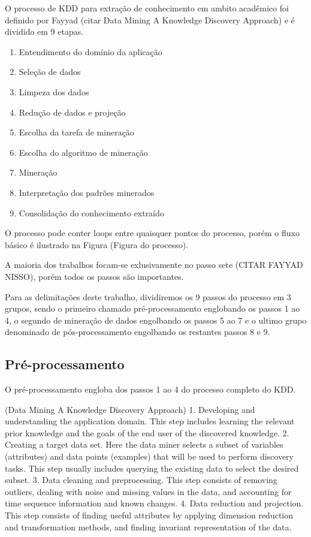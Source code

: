 O processo de KDD para extração de conhecimento em ambito acadêmico foi definido por Fayyad (citar Data Mining A Knowledge Discovery Approach) e é dividido em 9 etapas.

\begin{enumerate}
	\item Entendimento do domínio da aplicação
	\item Seleção de dados
	\item Limpeza dos dados
	\item Redução de dados e projeção
	\item Escolha da tarefa de mineração
	\item Escolha do algoritmo de mineração
	\item Mineração
	\item Interpretação dos padrões minerados
	\item Consolidação do conhecimento extraído
\end{enumerate}

O processo pode conter loops entre quaisquer pontos do processo, porém o fluxo básico é ilustrado na Figura (Figura do processo).

A maioria dos trabalhos focam-se exlusivamente no passo sete (CITAR FAYYAD NISSO), porém todos os passos são importantes.

Para as delimitações deste trabalho, dividiremos os 9 passos do processo em 3 grupos, sendo o primeiro chamado pré-processamento englobando os passos 1 ao 4, o segundo de mineração de dados engolbando os passos 5 ao 7 e o ultimo grupo denominado de pós-processamento engolbando os restantes passos 8 e 9.

\subsection{Pré-processamento}
\label{subsec:preprocKDD}

O pré-processamento engloba dos passos 1 ao 4 do processo completo do KDD.

(Data Mining A Knowledge Discovery Approach)
1. Developing and understanding the application domain. This step includes learning the relevant prior knowledge and the goals of the end user of the discovered knowledge.
2. Creating a target data set. Here the data miner selects a subset of variables (attributes) and data points (examples) that will be used to perform discovery tasks. This step usually includes querying the existing data to select the desired subset.
3. Data cleaning and preprocessing. This step consists of removing outliers, dealing with noise and missing values in the data, and accounting for time sequence information and known changes.
4. Data reduction and projection. This step consists of finding useful attributes by applying dimension reduction and transformation methods, and finding invariant representation of the data.

